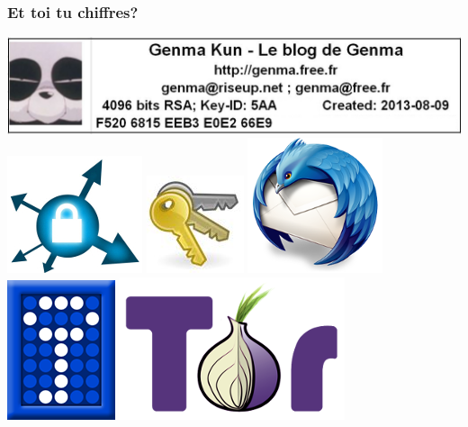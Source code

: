 \documentclass{beamer}
\begin{document}
\begin{frame}
\frametitle{Et toi tu chiffres?}
\begin{center}
\includegraphics[scale=0.3] {./Illustrations/clef_papier.jpg} 
\\
 \includegraphics[scale=0.3] {./Illustrations/https_everywhere_new_logo.jpg} 
 \includegraphics[scale=0.5] {./Illustrations/seahorse.jpg} 
 \includegraphics[scale=0.3] {./Illustrations/thunderbird.png} 
 \includegraphics[scale=0.3] {./Illustrations/truecrypt.png} 
 \includegraphics[scale=0.3] {./Illustrations/tor.png} 
\end{center}
\end{frame}
\end{document}
